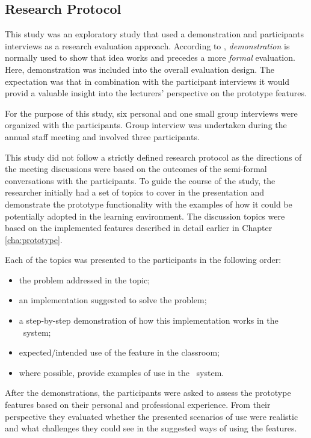 \subsection{Research Protocol}

This study was an exploratory study that used a demonstration and participants
interviews as a research evaluation approach. According to \citet{Peffers2008},
\textit{demonstration} is normally used to show that idea works and precedes a
more \textit{formal} evaluation. Here, demonstration was included into the
overall evaluation design. The expectation was that in combination with the
participant interviews it would provid a valuable insight into the lecturers'
perspective on the prototype features.

For the purpose of this study, six personal and one small group interviews were
organized with the participants. Group interview was undertaken during the
annual staff meeting and involved three participants.

This study did not follow a strictly defined research protocol as the directions
of the meeting discussions were based on the outcomes of the semi-formal
conversations with the participants. To guide the course of the study, the
researcher initially had a set of topics to cover in the presentation and
demonstrate the prototype functionality with the examples of how it could be
potentially adopted in the learning environment. The discussion topics were
based on the implemented features described in detail earlier in Chapter
\ref{cha:prototype}.

Each of the topics was presented to the participants in the following order:

\begin{itemize}
  \item the problem addressed in the topic;
  \item an implementation suggested to solve the problem;
  \item a step-by-step demonstration of how this implementation works in the
  \ep~system;
  \item expected/intended use of the feature in the classroom;
  \item where possible, provide examples of use in the \ep~system.
\end{itemize}

After the demonstrations, the participants were asked to assess the prototype
features based on their personal and professional experience. From their
perspective they evaluated whether the presented scenarios of use were realistic
and what challenges they could see in the suggested ways of using the features.

